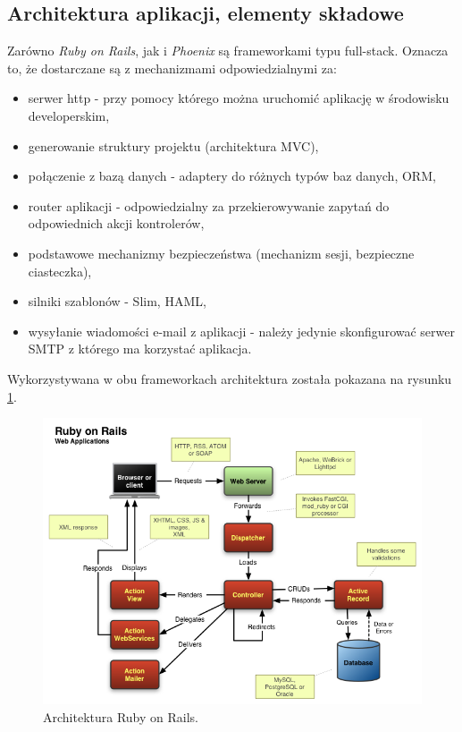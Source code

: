 \documentclass[mgr,oneside]{mgr}
\begin{document}
\subsection{Architektura aplikacji, elementy składowe}
Zarówno \textit{Ruby on Rails}, jak i \textit{Phoenix} są frameworkami typu full-stack. Oznacza to, że dostarczane są z mechanizmami odpowiedzialnymi za:
\begin{itemize}
  \item serwer http - przy pomocy którego można uruchomić aplikację w środowisku developerskim,
  \item generowanie struktury projektu (architektura MVC),
  \item połączenie z bazą danych - adaptery do różnych typów baz danych, ORM,
  \item router aplikacji - odpowiedzialny za przekierowywanie zapytań do odpowiednich akcji kontrolerów,
  \item podstawowe mechanizmy bezpieczeństwa (mechanizm sesji, bezpieczne ciasteczka),
  \item silniki szablonów - Slim, HAML,
  \item wysyłanie wiadomości e-mail z aplikacji - należy jedynie skonfigurować serwer SMTP z którego ma korzystać aplikacja.
\end{itemize}

Wykorzystywana w obu frameworkach architektura została pokazana na rysunku \ref{fig:rails_architecture}.
\newpage
\begin{figure}[h]
  \centering
  \includegraphics[width=\linewidth]{images/rails_architecture}
  \caption{Architektura Ruby on Rails.}
  \label{fig:rails_architecture}
\end{figure}
\end{document}
